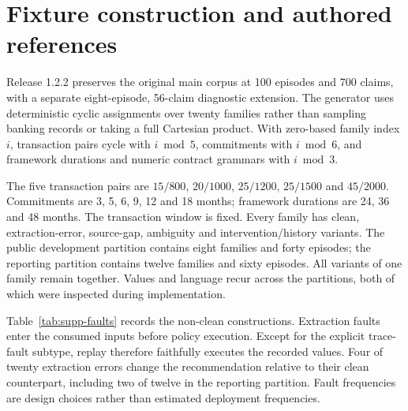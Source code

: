 \section{Fixture construction and authored references}
\label{app:fixtures}

Release 1.2.2 preserves the original main corpus at 100 episodes and 700 claims, with a separate eight-episode, 56-claim diagnostic extension. The generator uses deterministic cyclic assignments over twenty families rather than sampling banking records or taking a full Cartesian product. With zero-based family index $i$, transaction pairs cycle with $i\bmod5$, commitments with $i\bmod6$, and framework durations and numeric contract grammars with $i\bmod3$.

The five transaction pairs are $15/800$, $20/1000$, $25/1200$, $25/1500$ and $45/2000$. Commitments are 3, 5, 6, 9, 12 and 18 months; framework durations are 24, 36 and 48 months. The transaction window is fixed. Every family has clean, extraction-error, source-gap, ambiguity and intervention/history variants. The public development partition contains eight families and forty episodes; the reporting partition contains twelve families and sixty episodes. All variants of one family remain together. Values and language recur across the partitions, both of which were inspected during implementation.

Table~\ref{tab:supp-faults} records the non-clean constructions. Extraction faults enter the consumed inputs before policy execution. Except for the explicit trace-fault subtype, replay therefore faithfully executes the recorded values. Four of twenty extraction errors change the recommendation relative to their clean counterpart, including two of twelve in the reporting partition. Fault frequencies are design choices rather than estimated deployment frequencies.

